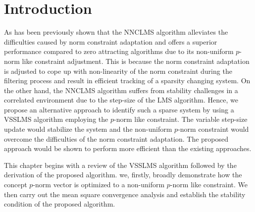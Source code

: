 
\section{Introduction}\label{sec4.1}
\vspace{-0.5cm}
\noindent As has been previously shown that the NNCLMS algorithm alleviates the difficulties caused by norm constraint adaptation and offers a  superior performance compared to zero attracting algorithms due to its non-uniform $p$-norm like constraint adjustment. This is because the norm constraint adaptation is adjusted to cope up with non-linearity of the norm constraint during the filtering process and result in efficient tracking of a sparsity changing system. On the other hand, the NNCLMS algorithm suffers from stability challenges in a correlated environment due to the step-size of the LMS algorithm. Hence, we propose an alternative approach to identify such a sparse system by using a VSSLMS algorithm employing the $p$-norm like constraint. The variable step-size update would stabilize the system and the non-uniform $p$-norm constraint would overcome the difficulties of the norm constraint adaptation. The proposed approach would be shown to perform more efficient than the existing approaches.

\vspace{-0.5cm}
\par
\noindent This chapter begins with a review of the VSSLMS algorithm followed by the derivation of the proposed algorithm. we, firstly,  broadly demonstrate how the concept $p$-norm vector is optimized to a non-uniform $p$-norm like constraint. We then carry out the mean square convergence analysis and establish the stability condition of the proposed algorithm.

\vspace{-0.3cm}
